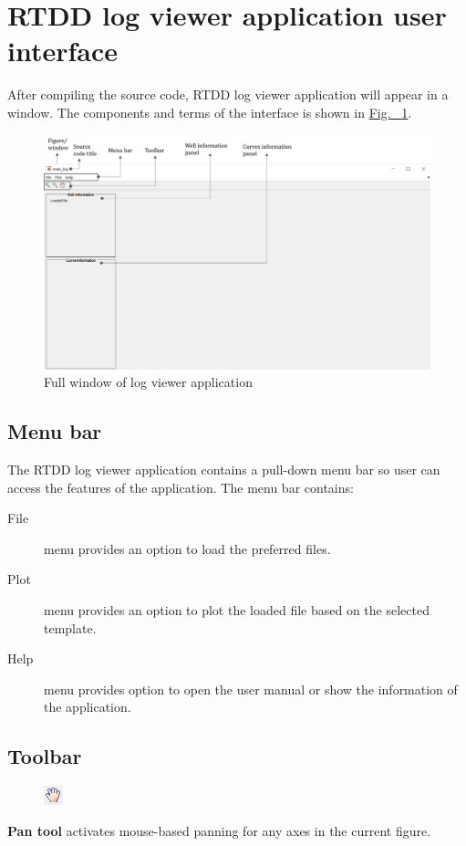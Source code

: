 \documentclass[12pt,a4paper,oneside]{report}
\begin{document}
\section{RTDD log viewer application user interface}
After compiling the source code, RTDD log viewer application will appear in a window. The components and terms of the interface is shown in \hyperref[fig:full_window]{Fig. ~\ref{fig:full_window}}.
\begin{figure}[h]
\centering
\includegraphics[width=1\textwidth]{full_win_desc.png}
\caption{Full window of log viewer application}
\label{fig:full_window}
\end{figure}

\subsection{Menu bar}
The RTDD log viewer application contains a pull-down menu bar so user can access the features of the application. The menu bar contains:
\begin{description}
\item[File] menu provides an option to load the preferred files.
\item[Plot] menu provides an option to plot the loaded file based on the selected template.
\item[Help] menu provides option to open the user manual or show the information of the application.
\end{description}


\subsection{Toolbar}
\begin{figure}
\vspace{-15pt}
\includegraphics[scale=1]{scopes_button_pan.png}
\end{figure}
\textbf{Pan tool} activates mouse-based panning for any axes in the current figure.
\end{document}
